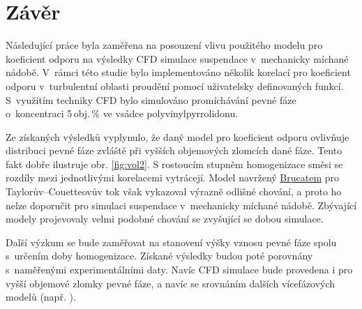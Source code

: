 \chapter{Závěr}
Následující práce byla zaměřena na posouzení vlivu použitého modelu pro koeficient odporu na výsledky CFD simulace suspendace v~mechanicky míchané nádobě. V~rámci této studie bylo implementováno několik korelací pro koeficient odporu v~turbulentní oblasti proudění pomocí uživatelsky definovaných funkcí. S~využitím techniky CFD bylo simulováno promíchávání pevné fáze o~koncentraci 5\,obj.\,\% ve vsádce polyvinylpyrrolidonu.

Ze získaných výsledků vyplynulo, že daný model pro koeficient odporu ovlivňuje distribuci pevné fáze zvláště při vyšších objemových zlomcích dané fáze. Tento fakt dobře ilustruje obr. \ref{fig:vol2}. S rostoucím stupněm homogenizace směsi se rozdíly mezi jednotlivými korelacemi vytrácejí. Model navržený \hyperlink{hyp:cds}{Brucatem} pro Taylorův–Couetteovův tok však vykazoval výrazně odlišné chování, a proto ho nelze doporučit pro simulaci suspendace v~mechanicky míchané nádobě. Zbývající modely projevovaly velmi podobné chování se zvyšující se dobou simulace. 

Další výzkum se bude zaměřovat na stanovení výšky vznosu pevné fáze spolu s~určením doby homogenizace. Získané výsledky budou poté porovnány s~naměřenými experimentálními daty. Navíc CFD simulace bude provedena i pro vyšší objemové zlomky pevné fáze, a navíc se srovnáním dalších vícefázových modelů (např. ).  
